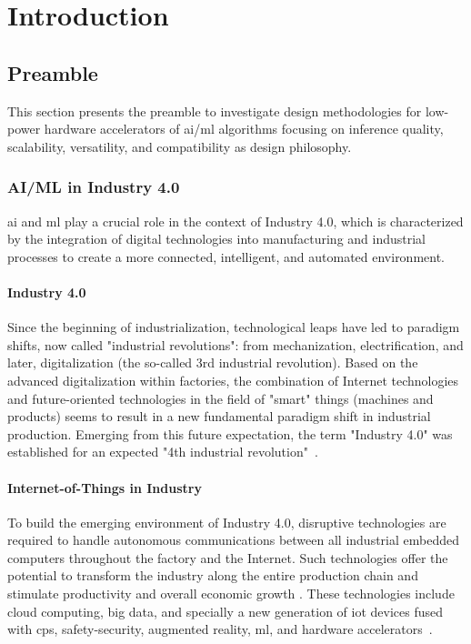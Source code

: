 \chapter{Introduction}\label{chap.intro}
\minitoc
\section{Preamble}

This section presents the preamble to investigate design methodologies for low-power hardware accelerators of \gls{ai}/\gls{ml} algorithms focusing on inference quality, scalability, versatility, and compatibility as design philosophy.

\subsection{AI/ML in Industry 4.0}
\gls{ai} and \gls{ml} play a crucial role in the context of Industry 4.0, which is characterized by the integration of digital technologies into manufacturing and industrial processes to create a more connected, intelligent, and automated environment.

\subsubsection{Industry 4.0}
Since the beginning of industrialization, technological leaps have led to paradigm shifts, now called "industrial revolutions": from mechanization, electrification, and later, digitalization (the so-called 3rd industrial revolution). Based on the advanced digitalization within factories, the combination of Internet technologies and future-oriented technologies in the field of "smart" things (machines and products) seems to result in a new fundamental paradigm shift in industrial production. Emerging from this future expectation, the term "Industry 4.0" was established for an expected "4th industrial revolution"~\cite{lasi2014industry}.


\subsubsection{Internet-of-Things in Industry}
To build the emerging environment of Industry 4.0, disruptive technologies are required to handle autonomous communications between all industrial embedded computers throughout the factory and the Internet. Such technologies offer the potential to transform the industry along the entire production chain and stimulate productivity and overall economic growth \cite{espinoza2020estimating}. These technologies include cloud computing, big data, and specially a new generation of \gls{iot} devices fused with \gls{cps}, safety-security, augmented reality, \gls{ml}, and hardware accelerators~\cite{alcacer2019scanning}.

